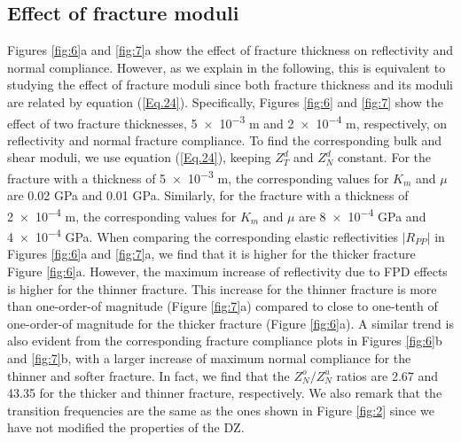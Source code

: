 \documentclass[draft]{agujournal2019}
\begin{document}
\subsection{Effect of fracture moduli}
Figures \ref{fig:6}a and \ref{fig:7}a show the effect of fracture thickness on reflectivity and normal compliance. However, as we  explain in the following, this is equivalent to studying the effect of fracture moduli since both fracture thickness and its moduli are related by equation (\ref{Eq.24}). 
Specifically, Figures \ref{fig:6} and \ref{fig:7} show the effect of two fracture thicknesses, \num{5e-3} m and \num{2e-4} m, respectively, on reflectivity and normal fracture compliance. To find the corresponding bulk and shear moduli, we use equation (\ref{Eq.24}), keeping  $Z_T^d$ and $Z_N^d$ constant. For the fracture with a  thickness of \num{5e-3} m, the corresponding values for $K_m$ and $\mu$ are 0.02 GPa and 0.01 GPa. Similarly, for the fracture  with a thickness of \num{2e-4} m, the corresponding values for $K_m$ and $\mu$ are  \num{8e-4} GPa and  \num{4e-4} GPa. When comparing the corresponding elastic reflectivities $|R_{PP}|$ in Figures \ref{fig:6}a and \ref{fig:7}a, we find that it is higher for the thicker fracture Figure \ref{fig:6}a. However, the maximum increase of reflectivity due to FPD effects is higher for the thinner fracture. This increase for the thinner fracture is more than one-order-of magnitude (Figure \ref{fig:7}a) compared to close to one-tenth of one-order-of magnitude for the thicker fracture (Figure \ref{fig:6}a). 
A similar trend is also evident from the corresponding fracture compliance plots in Figures \ref{fig:6}b and \ref{fig:7}b, with a larger increase of maximum normal compliance for the thinner and softer fracture. In fact, we find that the  $Z_N^o/Z_N^u$ ratios are 2.67 and 43.35 for the thicker and thinner fracture, respectively. We also remark that the transition frequencies are the same as the ones shown in Figure \ref{fig:2} since we have not modified the properties of the DZ.
\end{document}
